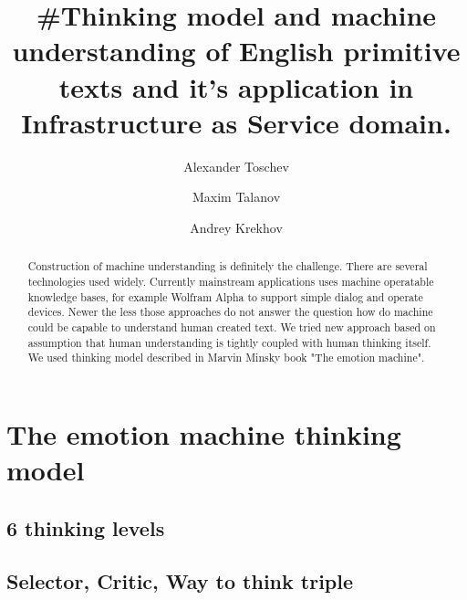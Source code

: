 \documentclass[runningheads,a4paper]{llncs}
\begin{document}
\mainmatter

\title{#Thinking model and machine understanding of English primitive texts and it's application in Infrastructure as Service domain.}


\author{Alexander Toschev \and Maxim Talanov \and Andrey Krekhov}


\maketitle

\begin{abstract}

Construction of machine understanding is definitely the challenge. There are several technologies used widely.
Currently mainstream applications uses machine operatable knowledge bases, for example Wolfram Alpha to support simple dialog and operate devices.
Newer the less those approaches do not answer the question how do machine could be capable to understand human created text.
We tried new approach based on assumption that human understanding is tightly coupled with human thinking itself.
We used thinking model described in Marvin Minsky book "The emotion machine"\cite{minsk}.

\end{abstract}

\section{The emotion machine thinking model}
\subsection{6 thinking levels}
\subsection{Selector, Critic, Way to think triple}
\end{document}
